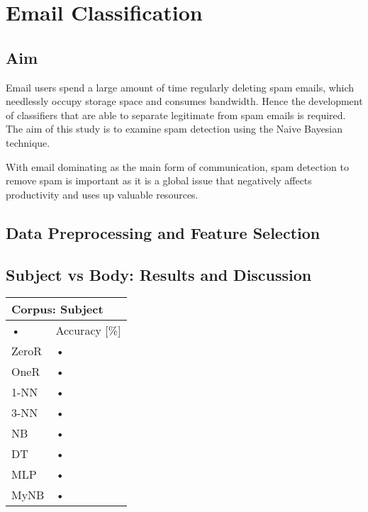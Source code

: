 \documentclass[10pt, a4paper]{article}
\begin{document}
\section{Email Classification}

\subsection*{Aim}

Email users spend a large amount of time regularly deleting spam emails, which needlessly occupy storage space and consumes bandwidth. Hence the development of classifiers that are able to separate legitimate from spam emails is required. The aim of this study is to examine spam detection using the Naive Bayesian technique. 

With email dominating as the main form of communication, spam detection to remove spam is important as it is a global issue that negatively affects productivity and uses up valuable resources. 

\subsection*{Data Preprocessing and Feature Selection}

\subsection*{Subject vs Body: Results and Discussion}

\begin{tabular}{|l|l|}
\hline 
\multicolumn{2}{|l|}{Corpus: Subject} \\ 
\hline 
• & Accuracy [\%] \\ 
\hline 
ZeroR & • \\ 
\hline 
OneR & • \\ 
\hline 
1-NN & • \\ 
\hline 
3-NN & • \\ 
\hline 
NB & • \\ 
\hline 
DT & • \\ 
\hline 
MLP & • \\ 
\hline 
MyNB & • \\ 
\hline 
\end{tabular} 
\end{document}
